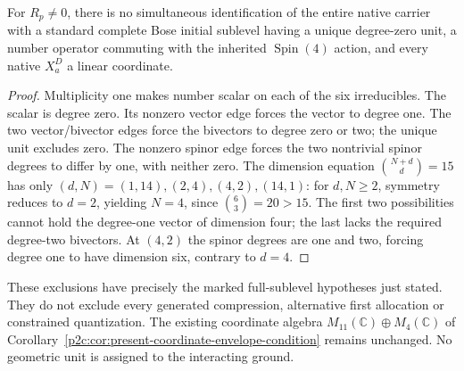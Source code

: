 \documentclass[11pt,a4paper]{article}
\begin{document}
\begin{proposition}
\label{p2b:prop:v2174-fifteen-dimensional-port-exclusion}
For $R_p\ne0$, there is no simultaneous identification of the entire native carrier with
a standard complete Bose initial sublevel having a unique degree-zero unit,
a number operator commuting with the inherited $\operatorname{Spin}(4)$
action, and every native $X_a^D$ a linear coordinate.
\end{proposition}
\begin{proof}
Multiplicity one makes number scalar on each of the six irreducibles.
The scalar is degree zero. Its nonzero vector edge forces the vector to
degree one. The two vector/bivector edges force the bivectors to degree
zero or two; the unique unit excludes zero. The nonzero spinor edge forces
the two nontrivial spinor degrees to differ by one, with neither zero.
The dimension equation $\binom{N+d}{d}=15$ has only
$(d,N)=(1,14),(2,4),(4,2),(14,1)$: for $d,N\ge2$, symmetry reduces
to $d=2$, yielding $N=4$, since $\binom63=20>15$.
The first two possibilities cannot hold the degree-one vector of dimension
four; the last lacks the required degree-two bivectors. At $(4,2)$ the
spinor degrees are one and two, forcing degree one to have dimension six,
contrary to $d=4$.
\end{proof}
These exclusions have precisely the marked full-sublevel hypotheses just
stated. They do not exclude every generated compression, alternative first
allocation or constrained quantization. The existing coordinate algebra
$M_{11}(\mathbb C)\oplus M_4(\mathbb C)$ of
Corollary~\ref{p2c:cor:present-coordinate-envelope-condition} remains
unchanged. No geometric unit is assigned to the interacting ground.
\end{document}
